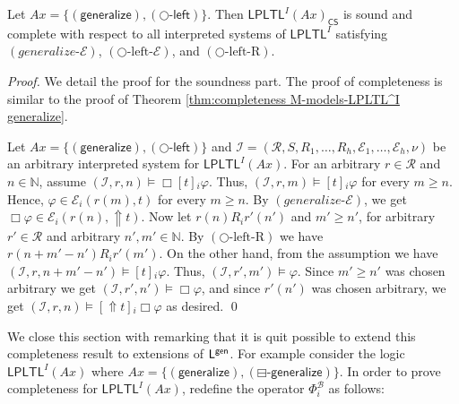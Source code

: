 \documentclass[envcountsect,envcountsame,oribibl,orivec]{llncs}
\newcommand{\lnext}{\bigcirc}
\newcommand{\lalways}{\Box}
\newcommand{\lsofar}{\boxminus}
\newcommand{\LPLTL}{\textsf{LPLTL}}
\newcommand{\jbox}[1]{\left[#1\right]\!}
\newcommand{\tgeneralize}{\Uparrow}
\newcommand{\CS}{\textsf{CS}}
\newcommand{\numberofagents}{h}
\newcommand{\agent}{i}
\newcommand{\generalizeprinciple}{\ensuremath{(\textsf{generalize})}}
\newcommand{\nextleftshiftprinciple}{\ensuremath{(\lnext\textsf{-left})}}
\newcommand{\pastgeneralizeprinciple}{\ensuremath{(\lsofar\textsf{-generalize})}}
\newcommand{\generalizeevidence}{\ensuremath{(generalize\text{-}\evidence)}}
\newcommand{\nextleftshiftevidence}{\ensuremath{(\lnext\text{-left-}\evidence)}}
\newcommand{\nextleftshiftR}{\ensuremath{(\lnext\text{-left-R})}}
\newcommand{\runs}{\mathcal{R}}
\newcommand{\system}{\mathcal{I}}
\newcommand{\evidence}{\mathcal{E}}
\newcommand{\valuation}{\nu}
\newcommand{\N}{\mathbb{N}}
\renewcommand{\phi}{\varphi}
\begin{document}
\begin{theorem}\label{thm:completeness-generalize-interpreted systems}
	Let $Ax = \{ \generalizeprinciple, \nextleftshiftprinciple \}$. Then $\LPLTL^I(Ax)_\CS$ is sound and complete with respect to all interpreted systems of $\LPLTL^I$ satisfying $\generalizeevidence$, $\nextleftshiftevidence$, and $\nextleftshiftR$.
\end{theorem}
\begin{proof}
	We detail the proof for the soundness part. The proof of completeness is similar to the proof of Theorem \ref{thm:completeness M-models-LPLTL^I generalize}.
	
	Let $Ax = \{ \generalizeprinciple, \nextleftshiftprinciple \}$ and $\system = (\runs, S, R_1,\ldots,R_\numberofagents, \evidence_1,\ldots,\evidence_\numberofagents, \valuation)$ be an arbitrary interpreted system for $\LPLTL^I(Ax)$. For an arbitrary $r \in \runs$ and $n \in \N$, assume $(\system, r, n) \models \lalways \jbox{t}_i \phi$. Thus, $(\system, r, m) \models  \jbox{t}_i \phi$ for every $m \geq n$. Hence, $\phi \in \evidence_\agent (r(m), t)$ for every $m \geq n$. By $\generalizeevidence$, we get $\lalways \phi \in \evidence_\agent (r(n), \tgeneralize t)$. Now let $r(n) R_i r'(n')$ and $m' \geq n'$, for arbitrary $r' \in \runs$ and arbitrary $n', m' \in \N$. By $\nextleftshiftR$ we have $r(n + m' - n') R_i r'(m')$. On the other hand, from the assumption we have $(\system, r, n + m' - n') \models  \jbox{t}_i \phi$. Thus, $(\system, r', m') \models   \phi$. Since $m' \geq n'$ was chosen arbitrary we get $(\system, r', n') \models  \lalways \phi$, and since $r'(n')$ was chosen arbitrary, we get $(\system, r, n) \models  \jbox{\tgeneralize t}_i \lalways \phi$ as desired. \qed
	
\end{proof}

We close this section with remarking that it is quit possible to extend this completeness result to extensions of ${\sf L}^{\sf gen}$. For example consider the logic $\LPLTL^I (Ax)$ where $Ax = \{ \generalizeprinciple, \pastgeneralizeprinciple \}$. In order to prove completeness for \linebreak $\LPLTL^I (Ax)$, redefine the operator $\Phi^\mathcal{B}_i$ as follows:
\end{document}
